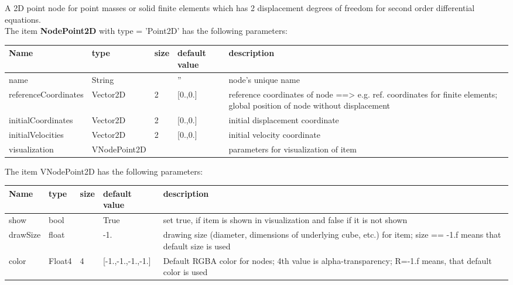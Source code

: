 A 2D point node for point masses or solid finite elements which has 2 displacement degrees of freedom for second order differential equations.
 \\\vspace{12pt} \noindent The item {\bf NodePoint2D} with type = 'Point2D' has the following parameters:\vspace{-1cm}\\ 
\begin{center}
  \footnotesize
  \begin{longtable}{| p{4.5cm} | p{2.5cm} | p{0.5cm} | p{2.5cm} | p{6cm} |}
    \hline
    \bf Name & \bf type & \bf size & \bf default value & \bf description \\ \hline
    name &     String &      &     '' &     node's unique name\\ \hline
    referenceCoordinates &     Vector2D &     2 &     [0.,0.] &     reference coordinates of node ==> e.g. ref. coordinates for finite elements; global position of node without displacement\\ \hline
    initialCoordinates &     Vector2D &     2 &     [0.,0.] &     initial displacement coordinate\\ \hline
    initialVelocities &     Vector2D &     2 &     [0.,0.] &     initial velocity coordinate\\ \hline
    visualization & VNodePoint2D & & & parameters for visualization of item \\ \hline
	  \end{longtable}
	\end{center}
The item VNodePoint2D has the following parameters:\vspace{-1cm}\\ 
\begin{center}
  \footnotesize
  \begin{longtable}{| p{4.5cm} | p{2.5cm} | p{0.5cm} | p{2.5cm} | p{6cm} |}
    \hline
    \bf Name & \bf type & \bf size & \bf default value & \bf description \\ \hline
    show &     bool &      &     True &     set true, if item is shown in visualization and false if it is not shown\\ \hline
    drawSize &     float &      &     -1. &     drawing size (diameter, dimensions of underlying cube, etc.)  for item; size == -1.f means that default size is used\\ \hline
    color &     Float4 &     4 &     [-1.,-1.,-1.,-1.] &     Default RGBA color for nodes; 4th value is alpha-transparency; R=-1.f means, that default color is used\\ \hline
	  \end{longtable}
	\end{center}


